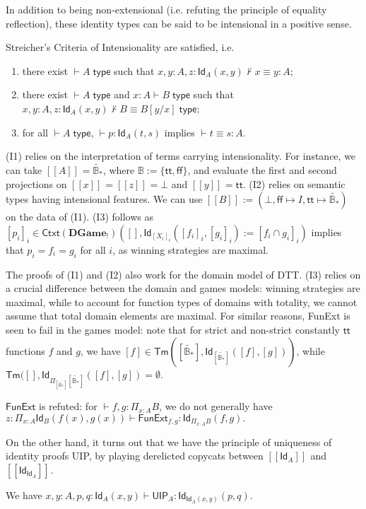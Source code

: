 \documentclass[runningheads,a4paper]{llncs}
\newcommand{\sem}[2][M\!,g]{ [\![ #2 ]\!]^{}}
\newcommand{\B}[0]{\widetilde{\mathbb{B}_*}}
\newcommand{\ttt}[0]{\mathsf{tt}}
\newcommand{\fff}[0]{\mathsf{ff}}
\newcommand{\DGame}{\mathbf{DGame}}
\begin{document}
In addition to being non-extensional (i.e. refuting the principle of equality reflection), these identity types can be said to be intensional in a positive sense.
\begin{theorem}Streicher's Criteria of Intensionality \cite{streicher1993investigations} are satisfied, i.e. \vspace{-4pt}
\begin{enumerate}
\item[(I1)] there exist $\vdash A\;\mathsf{type}$ such that $x,y:A,z:\mathsf{Id}_A(x,y)\not\vdash x\equiv y:A$;
\item[(I2)] there exist $\vdash A\;\mathsf{type}$ and $x:A\vdash B\;\mathsf{type}$ such that  $x,y:A, z:\mathsf{Id}_A(x,y)\not\vdash B\equiv B[y/x]\;\mathsf{type}$;
\item[(I3)] for all $\vdash A\;\mathsf{type}$, $\vdash p:\mathsf{Id}_A(t,s)$ implies $\vdash t\equiv s:A$.
\end{enumerate}
\end{theorem}
(I1) relies on the interpretation of terms carrying intensionality. For instance, we can take $\sem{A}=\B$, where $\mathbb{B}:=\{\ttt,\fff\}$, and evaluate the first and second projections on $\sem{x}=\sem{z}=\bot$ and $\sem{y}=\ttt$. (I2) relies on semantic types having intensional features. We can use $\sem{B}:=(\bot,\fff\mapsto I,\ttt\mapsto\B)$ on the data of (I1). (I3) follows as $[p_i]_i\in\mathsf{Ctxt}(\DGame_!)([],\mathsf{Id}_{[X_i]_i}([f_i]_i,[g_i]_i):=[f_i\cap g_i]_i)$ implies that $p_i=f_i=g_i$ for all $i$, as winning strategies are maximal.


The proofs of (I1) and (I2) also work for the domain model of \textsf{DTT}. (I3) relies on a crucial difference between the domain and games models: winning strategies are maximal, while to account for function types of domains with totality, we cannot assume that total domain elements are maximal. For similar reasons, \textsf{FunExt} is seen to fail in the games model: note that for strict and non-strict constantly $\ttt$ functions $f$ and $g$, we have $[f]\in \mathsf{Tm}([\B],\mathsf{Id}_{[\B]}([f],[g]))$, while $\mathsf{Tm}([],\mathsf{Id}_{\Pi_{[\B]}[\B]}([f],[g])=\emptyset$.
\begin{theorem}\label{thm:id} $\mathsf{FunExt}$ is refuted: for $\vdash f,g:\Pi_{x:A}B$, we do not generally have $z:\Pi_{x:A}\mathsf{Id}_B(f(x),g(x))\vdash\mathsf{FunExt}_{f,g}:\mathsf{Id}_{\Pi_{x:A}B}(f,g). $
\end{theorem}
On the other hand, it turns out that we have the principle of uniqueness of identity proofs \textsf{UIP}, by playing derelicted copycats between $\sem{\mathsf{Id}_A}$ and $\sem{\mathsf{Id}_{\mathsf{Id}_{{A}}}}$.
\begin{theorem}We have $x,y:A,p,q:\mathsf{Id}_A(x,y)\vdash \mathsf{UIP}_A: \mathsf{Id}_{\mathsf{Id}_A(x,y)}(p,q)$.
\end{theorem}
\end{document}
